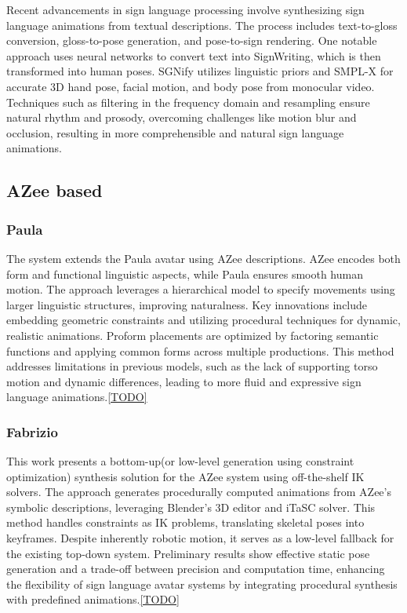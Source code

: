 Recent advancements in sign language processing involve synthesizing sign language animations from textual descriptions. The process includes text-to-gloss conversion, gloss-to-pose generation, and pose-to-sign rendering. One notable approach uses neural networks to convert text into SignWriting, which is then transformed into human poses. SGNify utilizes linguistic priors and SMPL-X for accurate 3D hand pose, facial motion, and body pose from monocular video. Techniques such as filtering in the frequency domain and resampling ensure natural rhythm and prosody, overcoming challenges like motion blur and occlusion, resulting in more comprehensible and natural sign language animations.

\subsection{AZee based}

\subsubsection{Paula}

The system extends the Paula\cite{TODO} avatar using AZee descriptions. AZee encodes both form and functional linguistic aspects, while Paula ensures smooth human motion. The approach leverages a hierarchical model to specify movements using larger linguistic structures, improving naturalness. Key innovations include embedding geometric constraints and utilizing procedural techniques for dynamic, realistic animations. Proform placements are optimized by factoring semantic functions and applying common forms across multiple productions. This method addresses limitations in previous models, such as the lack of supporting torso motion and dynamic differences, leading to more fluid and expressive sign language animations.\ref{TODO}

\subsubsection{Fabrizio}

This work presents a bottom-up(or low-level generation using constraint optimization) synthesis solution for the AZee system using off-the-shelf IK solvers. The approach generates procedurally computed animations from AZee's symbolic descriptions, leveraging Blender's 3D editor and iTaSC solver. This method handles constraints as IK problems, translating skeletal poses into keyframes. Despite inherently robotic motion, it serves as a low-level fallback for the existing top-down system. Preliminary results show effective static pose generation and a trade-off between precision and computation time, enhancing the flexibility of sign language avatar systems by integrating procedural synthesis with predefined animations.\ref{TODO}

